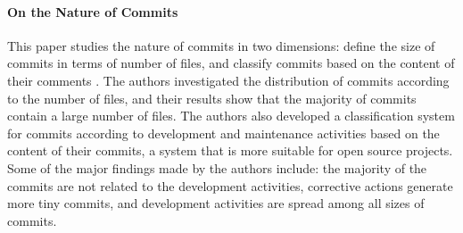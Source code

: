 {\paragraph{On the Nature of Commits}
This paper studies the nature of commits in two dimensions: define the
size of commits in terms of number of files, and classify commits
based on the content of their comments \cite{hattori2008nature}. The
authors investigated the distribution of commits according to the
number of files, and their results show that the majority of commits
contain a large number of files. The authors also developed a
classification system for commits according to development and
maintenance activities based on the content of their commits, a system
that is more suitable for open source projects. Some of the major
findings made by the authors include: the majority of the commits are
not related to the development activities, corrective actions generate
more tiny commits, and development activities are spread among all
sizes of commits.
}
